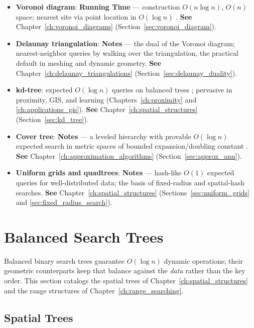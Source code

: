 \begin{itemize}
  \item \textbf{Voronoi diagram}: \textbf{Running Time} --- construction
    $O(n\log n)$, $O(n)$ space; nearest site via point location in
    $O(\log n)$ \cite{shamos1975}. \textbf{See}
    Chapter~\ref{ch:voronoi_diagrams} (Section~\ref{sec:voronoi_diagram}).
  \item \textbf{Delaunay triangulation}: \textbf{Notes} --- the dual of
    the Voronoi diagram; nearest-neighbor queries by walking over the
    triangulation, the practical default in meshing and dynamic geometry.
    \textbf{See} Chapter~\ref{ch:delaunay_triangulations}
    (Section~\ref{sec:delaunay_duality}).
  \item \textbf{kd-tree}: expected $O(\log n)$ queries on balanced trees
    \cite{bentley1975}; pervasive in proximity, GIS, and learning
    (Chapters~\ref{ch:proximity} and \ref{ch:applications_gis}).
    \textbf{See} Chapter~\ref{ch:spatial_structures} (Section~\ref{sec:kd_tree}).
  \item \textbf{Cover tree}: \textbf{Notes} --- a leveled
    hierarchy with provable $O(\log n)$ expected search in metric spaces
    of bounded expansion/doubling constant \cite{beygelzimer2006}.
    \textbf{See} Chapter~\ref{ch:approximation_algorithms}
    (Section~\ref{sec:approx_ann}).
  \item \textbf{Uniform grids and quadtrees}: \textbf{Notes} --- hash-like
    $O(1)$ expected queries for well-distributed data; the basis of
    fixed-radius and spatial-hash searches. \textbf{See}
    Chapter~\ref{ch:spatial_structures} (Sections~\ref{sec:uniform_grids}
    and \ref{sec:fixed_radius_search}).
\end{itemize}

\section{Balanced Search Trees}
\label{sec:app_alg_balanced_trees}

Balanced binary search trees guarantee $O(\log n)$ dynamic operations; their
geometric counterparts keep that balance against the \emph{data} rather than
the key order. This section catalogs the spatial trees of
Chapter~\ref{ch:spatial_structures} and the range structures of
Chapter~\ref{ch:range_searching}.

\subsection{Spatial Trees}
\label{sec:appalgs_trees_spatial}

